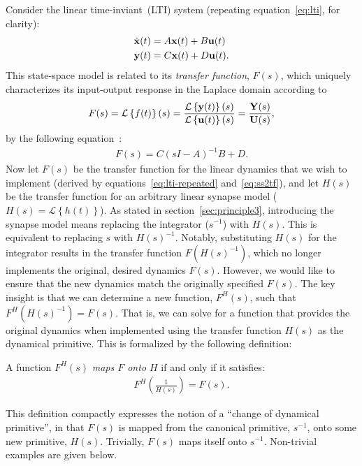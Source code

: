 Consider the linear time-inviant~(LTI) system (repeating equation~\ref{eq:lti}, for clarity):
\begin{equation} \label{eq:lti-repeated}
\begin{split}
\dot{\mathbf{x}}(t) &= A\mathbf{x}(t) + B\mathbf{u}(t) \\
\mathbf{y}(t) &= C\mathbf{x}(t) + D\mathbf{u}(t) \text{.}
\end{split}
\end{equation}
This state-space model is related to its \emph{transfer function}, $F(s)$, which uniquely characterizes its input-output response in the Laplace domain according to
$$
F(s) = \mathcal{L}\left\{{f(t)}\right\}(s) = \frac{\mathcal{L}\left\{{\mathbf{y}(t)}\right\}(s)}{\mathcal{L}\left\{{\mathbf{u}(t)}\right\}(s)} = \frac{\mathbf{Y}(s)}{\mathbf{U}(s)} \text{,}
$$
by the following equation~\citep{brogan1982modern}:
\begin{align} \label{eq:ss2tf}
F(s) = C(sI - A)^{-1}B + D \text{.}
\end{align}
Now let $F(s)$ be the transfer function for the linear dynamics that we wish to implement (derived by equations~\ref{eq:lti-repeated} and~\ref{eq:ss2tf}), and let $H(s)$ be the transfer function for an arbitrary linear synapse model ($H(s) = \mathcal{L} \left\{ h(t) \right\}$).
As stated in section~\ref{sec:principle3}, introducing the synapse model means replacing the integrator ($s^{-1}$) with $H(s)$.
This is equivalent to replacing $s$ with $H(s)^{-1}$.
Notably, substituting $H(s)$ for the integrator results in the transfer function $F \left( H(s)^{-1} \right)$, which no longer implements the original, desired dynamics $F(s)$. %
However, we would like to ensure that the new dynamics match the originally specified $F(s)$.
The key insight is that we can determine a new function, $F^H(s)$, such that $F^{H}\left( H(s)^{-1} \right) = F(s)$.
That is, we can solve for a function that provides the original dynamics when implemented using the transfer function $H(s)$ as the dynamical primitive.
This is formalized by the following definition:
\begin{definition} \label{def:maps-onto}
A function $F^{H}(s)$ \emph{maps $F$ onto $H$} if and only if it satisfies:
\begin{align} \label{eq:maps-onto}
F^{H}\left( \frac{1}{H(s)} \right) = F(s) \text{.}
\end{align}
\end{definition}

This definition compactly expresses the notion of a ``change of dynamical primitive'', in that $F(s)$ is mapped from the canonical primitive, $s^{-1}$, onto some new primitive, $H(s)$.
Trivially, $F(s)$ maps itself onto $s^{-1}$.
Non-trivial examples are given below.

